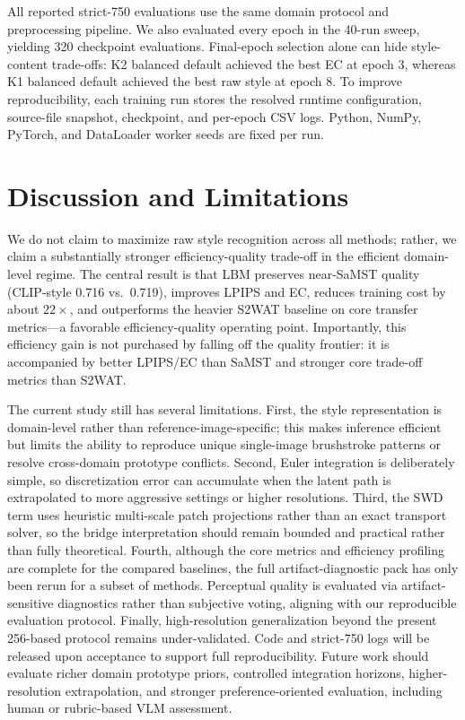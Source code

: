 ﻿\documentclass[letterpaper]{article}
\begin{document}
All reported strict-750 evaluations use the same domain protocol and preprocessing pipeline. We also evaluated every epoch in the 40-run sweep, yielding 320 checkpoint evaluations. Final-epoch selection alone can hide style-content trade-offs: K2 balanced default achieved the best EC at epoch 3, whereas K1 balanced default achieved the best raw style at epoch 8. To improve reproducibility, each training run stores the resolved runtime configuration, source-file snapshot, checkpoint, and per-epoch CSV logs. Python, NumPy, PyTorch, and DataLoader worker seeds are fixed per run.



\section{Discussion and Limitations}
We do not claim to maximize raw style recognition across all methods; rather, we claim a substantially stronger efficiency-quality trade-off in the efficient domain-level regime. The central result is that LBM preserves near-SaMST quality (CLIP-style 0.716 vs.\ 0.719), improves LPIPS and EC, reduces training cost by about $22\times$, and outperforms the heavier S2WAT baseline on core transfer metrics---a favorable efficiency-quality operating point. Importantly, this efficiency gain is not purchased by falling off the quality frontier: it is accompanied by better LPIPS/EC than SaMST and stronger core trade-off metrics than S2WAT.

The current study still has several limitations. First, the style representation is domain-level rather than reference-image-specific; this makes inference efficient but limits the ability to reproduce unique single-image brushstroke patterns or resolve cross-domain prototype conflicts. Second, Euler integration is deliberately simple, so discretization error can accumulate when the latent path is extrapolated to more aggressive settings or higher resolutions. Third, the SWD term uses heuristic multi-scale patch projections rather than an exact transport solver, so the bridge interpretation should remain bounded and practical rather than fully theoretical. Fourth, although the core metrics and efficiency profiling are complete for the compared baselines, the full artifact-diagnostic pack has only been rerun for a subset of methods. Perceptual quality is evaluated via artifact-sensitive diagnostics rather than subjective voting, aligning with our reproducible evaluation protocol. Finally, high-resolution generalization beyond the present 256-based protocol remains under-validated. Code and strict-750 logs will be released upon acceptance to support full reproducibility. Future work should evaluate richer domain prototype priors, controlled integration horizons, higher-resolution extrapolation, and stronger preference-oriented evaluation, including human or rubric-based VLM assessment.
\end{document}
